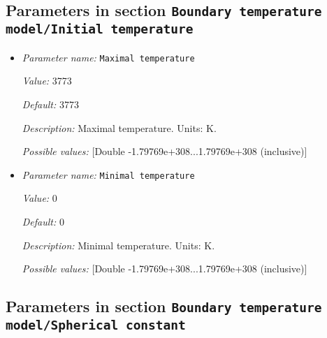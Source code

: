 \subsection{Parameters in section \tt Boundary temperature model/Initial temperature}
\label{parameters:Boundary_20temperature_20model/Initial_20temperature}

\begin{itemize}
\item {\it Parameter name:} {\tt Maximal temperature}
\label{parameters:Boundary temperature model/Initial temperature/Maximal temperature}


{\it Value:} 3773


{\it Default:} 3773


{\it Description:} Maximal temperature. Units: K.


{\it Possible values:} [Double -1.79769e+308...1.79769e+308 (inclusive)]
\item {\it Parameter name:} {\tt Minimal temperature}
\label{parameters:Boundary temperature model/Initial temperature/Minimal temperature}


{\it Value:} 0


{\it Default:} 0


{\it Description:} Minimal temperature. Units: K.


{\it Possible values:} [Double -1.79769e+308...1.79769e+308 (inclusive)]
\end{itemize}

\subsection{Parameters in section \tt Boundary temperature model/Spherical constant}
\label{parameters:Boundary_20temperature_20model/Spherical_20constant}

